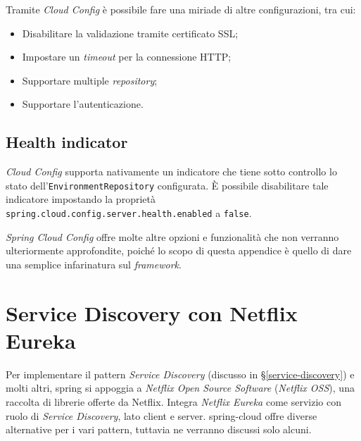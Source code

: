Tramite \textit{Cloud Config} è possibile fare una miriade di altre configurazioni, tra cui:

\begin{itemize}
	\item Disabilitare la validazione tramite certificato SSL;
	\item Impostare un \textit{timeout} per la connessione HTTP;
	\item Supportare multiple \textit{repository};
	\item Supportare l'autenticazione.
\end{itemize}

\subsection{Health indicator} \textit{Cloud Config} supporta nativamente un indicatore che
tiene sotto controllo lo stato dell'\texttt{EnvironmentRepository} configurata.
È possibile disabilitare tale indicatore impostando la proprietà \texttt{spring.cloud.config.server.health.enabled} a \texttt{false}.

\bigskip

\textit{Spring Cloud Config} offre molte altre opzioni e funzionalità che non verranno ulteriormente approfondite, poiché lo scopo di questa appendice è quello di dare una semplice infarinatura sul \textit{framework}.


\section{Service Discovery con Netflix Eureka}

Per implementare il pattern \textit{Service Discovery} (discusso in \S\ref{service-discovery}) e molti altri, \gls{spring} si appoggia a \textit{Netflix Open Source Software} (\textit{Netflix OSS}), una raccolta di librerie offerte da Netflix.
Integra \textit{Netflix Eureka} come servizio con ruolo di \textit{Service Discovery}, lato client e server. \gls{spring-cloud} offre diverse alternative per i vari pattern, tuttavia ne verranno discussi solo alcuni.

